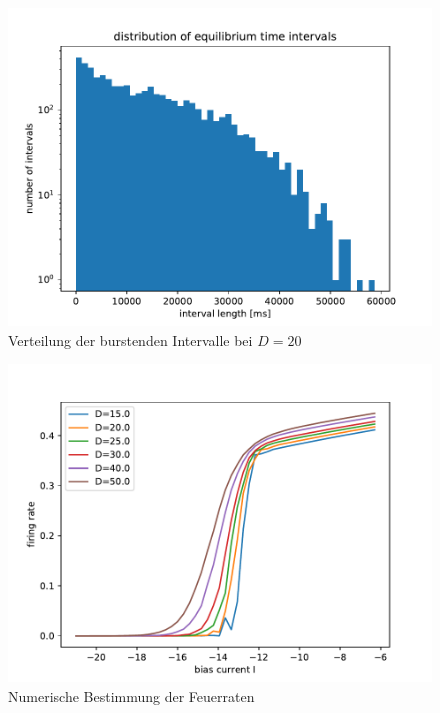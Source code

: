 \documentclass[12pt,a4paper]{article}
\begin{document}
\begin{figure}[H]
	\centering
	\includegraphics[scale=1]{eqdistajrj2realrinzelpoi26n12001.pdf}\caption{Verteilung der burstenden Intervalle bei $D=20$}
	\label{eq2001}
\end{figure}
\newpage
\begin{figure}[H]
	\centering
	\includegraphics[scale=1]{firingraterinzelnoiselong.pdf}\caption{Numerische Bestimmung der Feuerraten}
	\label{firatenoise}
\end{figure}
\end{document}
